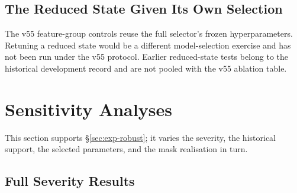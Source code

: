 \documentclass{article}
\begin{document}
\subsection{The Reduced State Given Its Own Selection}
\label{app:compact-selection}
The v55 feature-group controls reuse the full selector's frozen hyperparameters. Retuning a
reduced state would be a different model-selection exercise and has not been run under the
v55 protocol. Earlier reduced-state tests belong to the historical development record and
are not pooled with the v55 ablation table.

\section{Sensitivity Analyses}

This section supports \S\ref{sec:exp-robust}; it varies the severity, the historical
support, the selected parameters, and the mask realisation in turn.

\subsection{Full Severity Results}
\label{app:severity-full}
\end{document}
